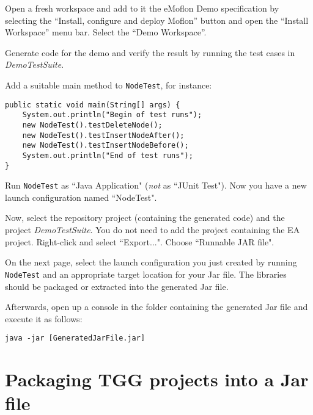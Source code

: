 \begin{stepbystep}
    
\item 
Open a fresh workspace and add to it the eMoflon Demo specification by selecting the ``Install, configure and deploy Moflon'' button and open the  ``Install Workspace'' menu bar. Select the ``Demo Workspace''.
    
\item 
Generate code for the demo and verify the result by running the test cases in \emph{DemoTestSuite}.

\item 
Add a suitable main method to \texttt{NodeTest}, for instance:
\begin{lstlisting}
public static void main(String[] args) {
    System.out.println("Begin of test runs");
    new NodeTest().testDeleteNode();
    new NodeTest().testInsertNodeAfter();
    new NodeTest().testInsertNodeBefore();
    System.out.println("End of test runs");
}
\end{lstlisting}

\item 
Run \texttt{NodeTest} as ``Java Application" (\emph{not} as ``JUnit Test").
Now you have a new launch configuration named ``NodeTest".

\item 
Now, select the repository project (containing the generated code) and the project \emph{DemoTestSuite}.
You do not need to add the project containing the EA project.
Right-click and select ``Export...".
Choose ``Runnable JAR file".
  
\item 
On the next page, select the launch configuration you just created by running \texttt{NodeTest} and an appropriate target location for your Jar file.
The libraries should be packaged or extracted into the generated Jar file.

\item 
Afterwards, open up a console in the folder containing the generated Jar file and execute it as follows:
\begin{lstlisting}
java -jar [GeneratedJarFile.jar]
\end{lstlisting}

    
\end{stepbystep}

\section{Packaging TGG projects into a Jar file}

